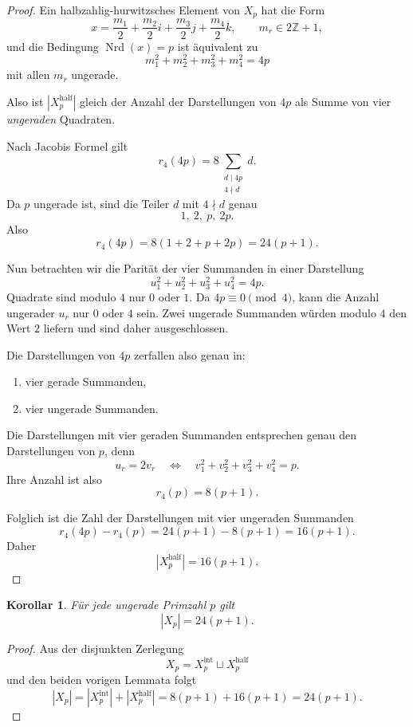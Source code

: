 \documentclass[12pt,a4paper]{article}
\theoremstyle{plain}
\newtheorem{korollar}[satz]{Korollar}
\theoremstyle{definition}
\theoremstyle{remark}
\newcommand{\Z}{\mathbb Z}
\newcommand{\nrd}{\operatorname{Nrd}}
\begin{document}
	\begin{proof}
		Ein halbzahlig-hurwitzsches Element von \(X_p\) hat die Form
		\[
		x=\frac{m_1}{2}+\frac{m_2}{2}i+\frac{m_3}{2}j+\frac{m_4}{2}k,
		\qquad m_r\in 2\Z+1,
		\]
		und die Bedingung \(\nrd(x)=p\) ist äquivalent zu
		\[
		m_1^2+m_2^2+m_3^2+m_4^2=4p
		\]
		mit allen \(m_r\) ungerade.
		
		Also ist \(|X_p^{\mathrm{half}}|\) gleich der Anzahl der Darstellungen von \(4p\) als Summe von vier \emph{ungeraden} Quadraten.
		
		Nach Jacobis Formel gilt
		\[
		r_4(4p)=8\sum_{\substack{d\mid 4p\\4\nmid d}} d.
		\]
		Da \(p\) ungerade ist, sind die Teiler \(d\) mit \(4\nmid d\) genau
		\[
		1,\ 2,\ p,\ 2p.
		\]
		Also
		\[
		r_4(4p)=8(1+2+p+2p)=24(p+1).
		\]
		
		Nun betrachten wir die Parität der vier Summanden in einer Darstellung
		\[
		u_1^2+u_2^2+u_3^2+u_4^2=4p.
		\]
		Quadrate sind modulo \(4\) nur \(0\) oder \(1\). Da \(4p\equiv0\pmod4\), kann die Anzahl ungerader \(u_r\) nur \(0\) oder \(4\) sein. Zwei ungerade Summanden würden modulo \(4\) den Wert \(2\) liefern und sind daher ausgeschlossen.
		
		Die Darstellungen von \(4p\) zerfallen also genau in:
		\begin{enumerate}
			\item vier gerade Summanden,
			\item vier ungerade Summanden.
		\end{enumerate}
		
		Die Darstellungen mit vier geraden Summanden entsprechen genau den Darstellungen von \(p\), denn
		\[
		u_r=2v_r
		\quad\Longleftrightarrow\quad
		v_1^2+v_2^2+v_3^2+v_4^2=p.
		\]
		Ihre Anzahl ist also
		\[
		r_4(p)=8(p+1).
		\]
		
		Folglich ist die Zahl der Darstellungen mit vier ungeraden Summanden
		\[
		r_4(4p)-r_4(p)=24(p+1)-8(p+1)=16(p+1).
		\]
		Daher
		\[
		|X_p^{\mathrm{half}}|=16(p+1).
		\]
	\end{proof}
	
	\begin{korollar}
		Für jede ungerade Primzahl \(p\) gilt
		\[
		|X_p|=24(p+1).
		\]
	\end{korollar}
	
	\begin{proof}
		Aus der disjunkten Zerlegung
		\[
		X_p=X_p^{\mathrm{int}}\sqcup X_p^{\mathrm{half}}
		\]
		und den beiden vorigen Lemmata folgt
		\[
		|X_p|
		=
		|X_p^{\mathrm{int}}|+|X_p^{\mathrm{half}}|
		=
		8(p+1)+16(p+1)
		=
		24(p+1).
		\]
	\end{proof}
	
\end{document}
